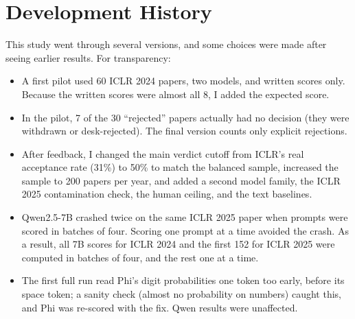 \documentclass[11pt]{article}
\begin{document}
\section{Development History}
\label{app:history}
This study went through several versions, and some choices were made after seeing earlier results. For transparency:
\begin{itemize}
  \item A first pilot used 60 ICLR 2024 papers, two models, and written scores only. Because the written scores were almost all 8, I added the expected score.
  \item In the pilot, 7 of the 30 ``rejected'' papers actually had no decision (they were withdrawn or desk-rejected). The final version counts only explicit rejections.
  \item After feedback, I changed the main verdict cutoff from ICLR's real acceptance rate (31\%) to 50\% to match the balanced sample, increased the sample to 200 papers per year, and added a second model family, the ICLR 2025 contamination check, the human ceiling, and the text baselines.
  \item Qwen2.5-7B crashed twice on the same ICLR 2025 paper when prompts were scored in batches of four. Scoring one prompt at a time avoided the crash. As a result, all 7B scores for ICLR 2024 and the first 152 for ICLR 2025 were computed in batches of four, and the rest one at a time.
  \item The first full run read Phi's digit probabilities one token too early, before its space token; a sanity check (almost no probability on numbers) caught this, and Phi was re-scored with the fix. Qwen results were unaffected.
\end{itemize}
\end{document}
